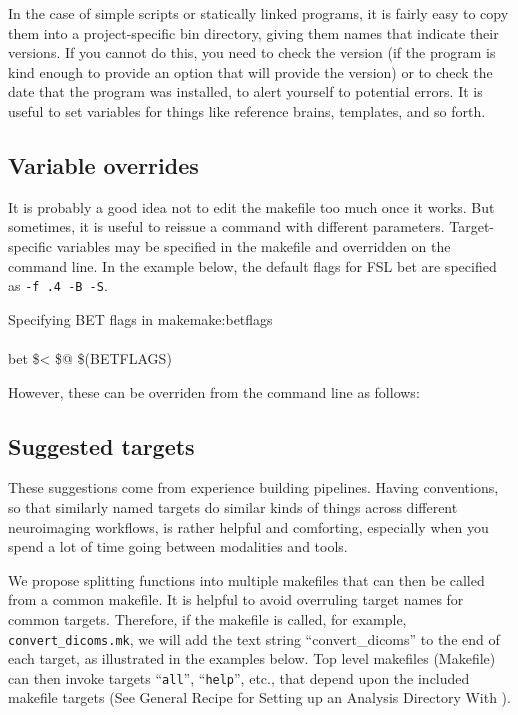 In the case of simple scripts or statically linked programs, it is fairly easy to copy them into a project-specific bin directory, giving them names that indicate their versions. If you cannot do this, you need to check the version (if the program is kind enough to provide an option that will provide the version) or to check the date that the program was installed, to alert yourself to potential errors. It is useful to set variables for things like reference brains, templates, and so forth. 

\subsection{Variable overrides}
It is probably a good idea not to edit the makefile too much once it works. But sometimes, it is useful to reissue a command with different parameters. Target-specific variables may be specified in the makefile and overridden on the command line. In the example below, the default flags for FSL bet are specified as \texttt{-f .4 -B -S}.

\begin{make}{Specifying BET flags in make}{make:betflags}
	 \\
	 \\
	\tab bet \$< \$@ \$(BETFLAGS) \\
\end{make}

However, these can be overriden from the command line as follows:


\subsection{Suggested targets}
These suggestions come from experience building pipelines. Having conventions, so that similarly named targets do similar kinds of things across different neuroimaging workflows, is rather helpful and comforting, especially when you spend a lot of time going between modalities and tools.

We propose splitting functions into multiple makefiles that can then be called from a common makefile. It is helpful to avoid overruling target names for common targets. Therefore, if the makefile is called, for example, \texttt{convert_dicoms.mk}, we will add the text string ``convert_dicoms'' to the end of each target, as illustrated in the examples below. Top level makefiles (Makefile) can then invoke targets ``\texttt{all}'', ``\texttt{help}'', etc., that depend upon the included makefile targets (See General Recipe for Setting up an Analysis Directory With \maken{}).\\

